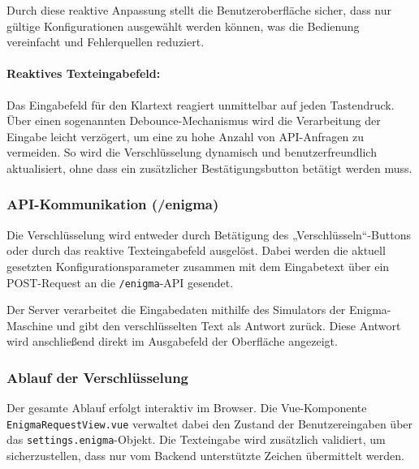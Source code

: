 \documentclass[12pt, ngerman, a4paper, numbers=noenddot]{article}
\begin{document}
Durch diese reaktive Anpassung stellt die Benutzeroberfläche sicher, dass nur gültige Konfigurationen ausgewählt werden können, was die Bedienung vereinfacht und Fehlerquellen reduziert.

\paragraph{Reaktives Texteingabefeld:}
Das Eingabefeld für den Klartext reagiert unmittelbar auf jeden Tastendruck. Über einen sogenannten Debounce-Mechanismus wird die Verarbeitung der Eingabe leicht verzögert, um eine zu hohe Anzahl von API-Anfragen zu vermeiden. So wird die Verschlüsselung dynamisch und benutzerfreundlich aktualisiert, ohne dass ein zusätzlicher Bestätigungsbutton betätigt werden muss.


\subsubsection{API-Kommunikation (/enigma)}

Die Verschlüsselung wird entweder durch Betätigung des „Verschlüsseln“-Buttons oder durch das reaktive Texteingabefeld ausgelöst. Dabei werden die aktuell gesetzten Konfigurationsparameter zusammen mit dem Eingabetext über ein POST-Request an die \lstinline|/enigma|-API gesendet.

Der Server verarbeitet die Eingabedaten mithilfe des Simulators der Enigma-Maschine und gibt den verschlüsselten Text als Antwort zurück. Diese Antwort wird anschließend direkt im Ausgabefeld der Oberfläche angezeigt.

\subsubsection{Ablauf der Verschlüsselung}

Der gesamte Ablauf erfolgt interaktiv im Browser. Die Vue-Komponente \newline \lstinline|EnigmaRequestView.vue| verwaltet dabei den Zustand der Benutzereingaben über das \lstinline|settings.enigma|-Objekt. Die Texteingabe wird zusätzlich validiert, um sicherzustellen, dass nur vom Backend unterstützte Zeichen übermittelt werden.
\end{document}

